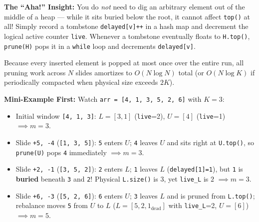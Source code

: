 \documentclass[11pt,a4paper]{article}
\theoremstyle{definition}
\newcommand{\ahabeat}{\textbf{\color{accentteal}The ``Aha!'' Insight:} }
\newcommand{\examplebeat}{\textbf{\color{primaryblue}Mini-Example First:} }
\begin{document}
\ahabeat You do \emph{not} need to dig an arbitrary element out of the middle of a heap --- while it sits buried below the root, it cannot affect \texttt{top()} at all! Simply record a tombstone \texttt{delayed[v]++} in a hash map and decrement the logical active counter \texttt{live}. Whenever a tombstone eventually floats to \texttt{H.top()}, \texttt{prune(H)} pops it in a \texttt{while} loop and decrements \texttt{delayed[v]}.

Because every inserted element is popped at most once over the entire run, all pruning work across $N$ slides amortizes to $O(N \log N)$ total (or $O(N \log K)$ if periodically compacted when physical size exceeds $2K$).

\examplebeat Watch \texttt{arr = [4, 1, 3, 5, 2, 6]} with $K = 3$:
\begin{itemize}[itemsep=1pt]
    \item Initial window \texttt{[4, 1, 3]}: $L = [3, 1]$ (\texttt{live}=2), $U = [4]$ (\texttt{live}=1) $\implies m = 3$.
    \item Slide \texttt{+5, -4} (\texttt{[1, 3, 5]}): \texttt{5} enters $U$; \texttt{4} leaves $U$ and sits right at \texttt{U.top()}, so \texttt{prune(U)} pops \texttt{4} immediately $\implies m = 3$.
    \item Slide \texttt{+2, -1} (\texttt{[3, 5, 2]}): \texttt{2} enters $L$; \texttt{1} leaves $L$ (\texttt{delayed[1]=1}), but \texttt{1} is \textbf{buried} beneath \texttt{3} and \texttt{2}! Physical \texttt{L.size()} is $3$, yet \texttt{live\_L} is $2$ $\implies m = 3$.
    \item Slide \texttt{+6, -3} (\texttt{[5, 2, 6]}): \texttt{6} enters $U$; \texttt{3} leaves $L$ and is pruned from \texttt{L.top()}; rebalance moves \texttt{5} from $U$ to $L$ ($L = [5, 2, 1_{\text{dead}}]$ with \texttt{live\_L}=2, $U=[6]$) $\implies m = 5$.
\end{itemize}
\end{document}
